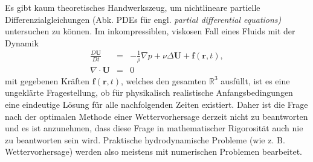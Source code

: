 \documentclass{book}
\newcommand{\md}[1]{\frac{D#1}{Dt}}
\begin{document}
Es gibt kaum theoretisches Handwerkszeug, um nichtlineare partielle Differenzialgleichungen (Abk. PDEs für engl. \textit{partial differential equations)} untersuchen zu können. Im inkompressiblen, viskosen Fall eines Fluids mit der Dynamik
%
\begin{eqnarray}
\md{\mathbf{U}} & = & -\frac{1}{\rho}\nabla p + \nu\Delta\mathbf{U} + \mathbf{f}\left(\mathbf{r}, t\right),\\
\nabla\cdot\mathbf{U} & = & 0
\end{eqnarray}
%
mit gegebenen Kräften $\mathbf{f}\left(\mathbf{r}, t\right)$, welches den gesamten $\mathbb{R}^3$ ausfüllt, ist es eine ungeklärte Fragestellung, ob für physikalisch realistische Anfangsbedingungen eine eindeutige Lösung für alle nachfolgenden Zeiten existiert. Daher ist die Frage nach der optimalen Methode einer Wettervorhersage derzeit nicht zu beantworten und es ist anzunehmen, dass diese Frage in mathematischer Rigorosität auch nie zu beantworten sein wird. Praktische hydrodynamische Probleme (wie z. B. Wettervorhersage) werden also meistens mit numerischen Problemen bearbeitet.
\end{document}
